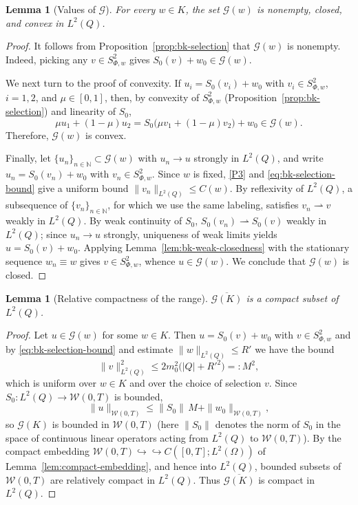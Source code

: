 \documentclass[11pt]{elsarticle}
\newtheorem{lemma}[theorem]{Lemma}
\theoremstyle{definition}
\theoremstyle{remark}
\numberwithin{equation}{section}
\begin{document}
\begin{lemma}[Values of $\mathcal{G}$]
	\label{lem:bk-values}
	For every $w\in K$, the set $\mathcal{G}(w)$ is nonempty, closed,
	and convex in $L^2(Q)$.
\end{lemma}

\begin{proof}
	It follows from
	Proposition~\ref{prop:bk-selection} that $\mathcal{G}(w)$ is nonempty.
	Indeed, picking any $v\in S^2_{\Phi,w}$ gives $S_0(v)+w_0\in\mathcal{G}(w)$.
	
	We next turn to the proof of convexity. If $u_i=S_0(v_i)+w_0$ with $v_i\in S^2_{\Phi,w}$,
	$i=1,2$, and $\mu\in[0,1]$, then, by convexity of $S^2_{\Phi,w}$
	(Proposition~\ref{prop:bk-selection}) and linearity of $S_0$,
	\[
	\mu u_1+(1-\mu)u_2
	=S_0\bigl(\mu v_1+(1-\mu)v_2\bigr)+w_0\in\mathcal{G}(w).
	\]
	Therefore, $\mathcal{G}(w)$ is convex.
	
	Finally, let $\{u_n\}_{n\in\mathbb{N}}\subset\mathcal{G}(w)$ with $u_n\to u$
	strongly in $L^2(Q)$, and write $u_n=S_0(v_n)+w_0$ with
	$v_n\in S^2_{\Phi,w}$. Since $w$ is fixed, \ref{P3} and
	\eqref{eq:bk-selection-bound} give a uniform bound
	$\|v_n\|_{L^2(Q)}\le C(w)$. By reflexivity of $L^2(Q)$, a
	subsequence of $\{v_n\}_{n\in\mathbb{N}}$, for which we use the same labeling,
	satisfies $v_n\rightharpoonup v$ weakly
	in $L^2(Q)$. By weak continuity of $S_0$,
	$S_0(v_n)\rightharpoonup S_0(v)$ weakly in $L^2(Q)$; since
	$u_n\to u$ strongly, uniqueness of weak limits yields
	$u=S_0(v)+w_0$. Applying Lemma~\ref{lem:bk-weak-closedness} with the
	stationary sequence $w_n\equiv w$ gives $v\in S^2_{\Phi,w}$, whence
	$u\in\mathcal{G}(w)$. We conclude that $\mathcal{G}(w)$ is closed.
\end{proof}

\begin{lemma}[Relative compactness of the range]
	\label{lem:bk-compact}
	$\overline{\mathcal{G}(K)}$ is a compact subset of $L^2(Q)$.
\end{lemma}

\begin{proof}
	Let $u\in\mathcal{G}(w)$ for some $w\in K$. Then $u=S_0(v)+w_0$ with
	$v\in S^2_{\Phi,w}$ and by \eqref{eq:bk-selection-bound} and estimate
	$\|w\|_{L^2(Q)}\le R'$ we have the bound
	\[
	\|v\|_{L^2(Q)}^2\le2m_0^2\bigl(|Q|+R'^2\bigr)=:M^2,
	\]
	which is uniform over $w\in K$ and over the choice of selection $v$.
	Since $S_0:L^2(Q)\to\mathcal{W}(0,T)$ is bounded,
	\[
	\|u\|_{\mathcal{W}(0,T)}
	\le\|S_0\|\,M+\|w_0\|_{\mathcal{W}(0,T)},
	\]
	so $\mathcal{G}(K)$ is bounded in $\mathcal{W}(0,T)$ (here $\|S_0\|$ denotes the norm of $S_0$ in the space of continuous linear operators acting from $L^2(Q)$ to $\mathcal{W}(0,T)$). By the compact
	embedding $\mathcal{W}(0,T)\hookrightarrow\hookrightarrow
	C([0,T];L^2(\Omega))$ of Lemma~\ref{lem:compact-embedding}, and hence
	into $L^2(Q)$, bounded subsets of $\mathcal{W}(0,T)$ are relatively
	compact in $L^2(Q)$. Thus $\overline{\mathcal{G}(K)}$ is compact in
	$L^2(Q)$.
\end{proof}
\end{document}
